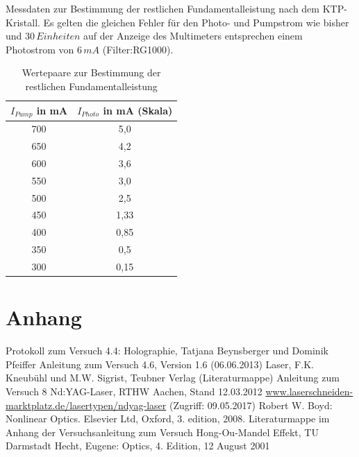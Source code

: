 \documentclass[twoside,colorback,accentcolor=tud4c,11pt]{tudreport}
\begin{document}
Messdaten zur Bestimmung der restlichen Fundamentalleistung nach dem KTP-Kristall. Es gelten die gleichen Fehler für den Photo- und Pumpstrom wie bisher und $30\,\si{Einheiten}$ auf der Anzeige des Multimeters entsprechen einem Photostrom von $6\,\si{mA}$ (Filter:RG1000).
\begin{table}[H]
\renewcommand*{\arraystretch}{1.2}
\centering
\begin{tabular}{|c|c|}
\hline 
$I_{Pump}$ in mA & $I_{Photo}$ in mA (Skala)\\
\hline 
700 & 5,0  \\ 
\hline 
650 & 4,2  \\ 
\hline 
600 & 3,6  \\ 
\hline 
550 & 3,0  \\ 
\hline 
500 & 2,5  \\ 
\hline
450 & 1,33 \\ 
\hline
400 & 0,85 \\ 
\hline
350 & 0,5 \\ 
\hline
300 & 0,15 \\ 
\hline
\end{tabular} 
\caption{Wertepaare zur Bestimmung der restlichen Fundamentalleistung}\label{restfund}
\end{table}
\chapter{Anhang}





		

\renewcommand{\bibname}{Literatur}
\begin{thebibliography}{0}
 Protokoll zum Versuch 4.4: Holographie, Tatjana Beynsberger und Dominik Pfeiffer 
 Anleitung zum Versuch 4.6, Version 1.6 (06.06.2013)
 Laser, F.K. Kneubühl und M.W. Sigrist, Teubner Verlag (Literaturmappe)
 Anleitung zum Versuch 8 Nd:YAG-Laser, RTHW Aachen, Stand 12.03.2012
 \url{www.laserschneiden-marktplatz.de/lasertypen/ndyag-laser} (Zugriff: 09.05.2017)
 Robert W. Boyd: Nonlinear Optics. Elsevier Ltd, Oxford, 3. edition, 2008.
 Literaturmappe im Anhang der Versuchsanleitung zum Versuch Hong-Ou-Mandel Effekt, TU Darmstadt
 Hecht, Eugene: Optics, 4. Edition, 12 August 2001
\end{thebibliography} 	
\end{document}
